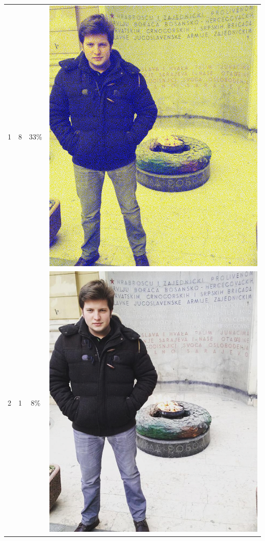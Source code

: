 \documentclass[times, utf8, seminar]{fer}
\begin{document}
\begin{center}
\begin{longtable}{|c|c|c|c|}
1 & 8 &33\% & \includegraphics[scale=0.3]{../benchmark_results/pattern/1_components-8_bits.png} \\
2 & 1 &8\% & \includegraphics[scale=0.3]{../benchmark_results/pattern/2_components-1_bits.png} \\

\end{longtable}
\end{center}
\end{document}
